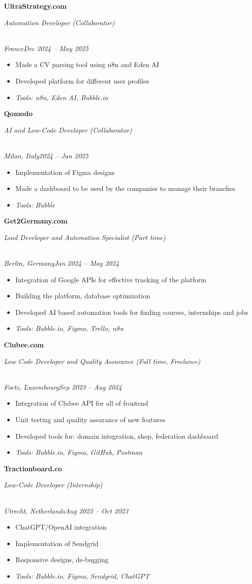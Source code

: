 \documentclass[a4paper,10pt]{article}
\newcommand{\role}[4]{\vspace{3pt}\noindent\hspace{0.6em}\parbox[t]{0.38\textwidth}{\raggedright\textbf{#1}}\hfill\parbox[t]{0.58\textwidth}{\raggedleft\textit{#2}}\\{\textit{#3}\hfill\textit{#4}}\vspace{1pt}}
\begin{document}
\role{UltraStrategy.com}{Automation Developer (Collaborator)}{France}{Dec 2024 -- May 2025}
\begin{itemize}
\item Made a CV parsing tool using n8n and Eden AI
\item Developed platform for different user profiles
\item \textit{Tools: n8n, Eden AI, Bubble.io}
\end{itemize}

\role{Qomodo}{AI and Low-Code Developer (Collaborator)}{Milan, Italy}{2024 -- Jan 2025}
\begin{itemize}
\item Implementation of Figma designs
\item Made a dashboard to be used by the companies to manage their branches
\item \textit{Tools: Bubble}
\end{itemize}

\role{Get2Germany.com}{Lead Developer and Automation Specialist (Part time)}{Berlin, Germany}{Jan 2024 -- May 2024}
\begin{itemize}
\item Integration of Google APIs for effective tracking of the platform
\item Building the platform, database optimization
\item Developed AI based automation tools for finding courses, internships and jobs
\item \textit{Tools: Bubble.io, Figma, Trello, n8n}
\end{itemize}

\role{Clubee.com}{Low Code Developer and Quality Assurance (Full time, Freelance)}{Foetz, Luxembourg}{Sep 2023 -- Aug 2024}
\begin{itemize}
\item Integration of Clubee API for all of frontend
\item Unit testing and quality assurance of new features
\item Developed tools for: domain integration, shop, federation dashboard
\item \textit{Tools: Bubble.io, Figma, GitHub, Postman}
\end{itemize}

\role{Tractionboard.co}{Low-Code Developer (Internship)}{Utrecht, Netherlands}{Aug 2023 -- Oct 2023}
\begin{itemize}
\item ChatGPT/OpenAI integration
\item Implementation of Sendgrid
\item Responsive designs, de-bugging
\item \textit{Tools: Bubble.io, Figma, Sendgrid, ChatGPT}
\end{itemize}
\end{document}
